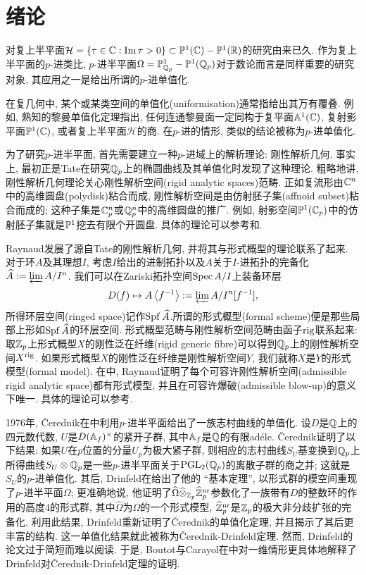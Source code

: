 \section{绪论}
对复上半平面$\mathcal{H} = \{\tau \in\C : \Im\tau > 0\}\subset \P^1(\C)-\P^1(\R)$的研究由来已久. 
作为复上半平面的$p$-进类比, $p$-进半平面$\Omega = \P^1_{\Q_p} - \P^1(\Q_p)$对于数论而言是同样重要的研究对象, 其应用之一是给出所谓的$p$-进单值化.

在复几何中, 某个或某类空间的单值化(uniformisation)通常指给出其万有覆叠.
例如, 熟知的黎曼单值化定理指出, 任何连通黎曼面一定同构于复平面$\A^1(\C)$, 复射影平面$\P^1(\C)$, 或者复上半平面$\mathcal{H}$的商. 在$p$-进的情形, 类似的结论被称为$p$-进单值化. 

为了研究$p$-进半平面, 首先需要建立一种$p$-进域上的解析理论: 刚性解析几何.
事实上, 最初正是Tate在研究$\Q_p$上的椭圆曲线及其单值化时发现了这种理论.
粗略地讲, 刚性解析几何理论关心刚性解析空间(rigid analytic spaces)范畴. 正如复流形由$\C^n$中的高维圆盘(polydisk)粘合而成, 刚性解析空间是由仿射胚子集(affnoid subset)粘合而成的; 这种子集是$\C_p^n$或$\Q_p^n$中的高维圆盘的推广. 例如, 射影空间$\P^1(\C_p)$中的仿射胚子集就是$\P^1$挖去有限个开圆盘. 具体的理论可以参考\cite{BS14}和\cite{FvdP}.

Raynaud发展了源自Tate的刚性解析几何, 并将其与形式概型的理论联系了起来. 对于环$A$及其理想$I$, 考虑$I$给出的进制拓扑以及$A$关于$I$-进拓扑的完备化$\hat{A} := \varprojlim A/I^n$.
我们可以在Zariski拓扑空间$\spec A/I$上装备环层\[D(f)\mapsto A\left<f^{-1}\right> := \varprojlim A/I^n[f^{-1}],\] 所得环层空间(ringed space)记作$\spf \hat{A}$.所谓的形式概型(formal scheme)便是那些局部上形如$\spf \hat{A}$的环层空间.
形式概型范畴与刚性解析空间范畴由函子$\rig$联系起来:
取$\Z_p$上形式概型$X$的刚性泛在纤维(rigid generic fibre)可以得到$\Q_p$上的刚性解析空间$X^{\rig}$.
如果形式概型$X$的刚性泛在纤维是刚性解析空间$Y$, 我们就称$X$是$Y$的形式模型(formal model).
在\cite{raynaud1974geometrie}中, Raynaud证明了每个可容许刚性解析空间(admissible rigid analytic space)都有形式模型, 并且在可容许爆破(admissible blow-up)的意义下唯一.
具体的理论可以参考\cite{BS14}.


1976年, \v{C}erednik在\cite{vcerednik1976uniformization}中利用$p$-进半平面给出了一族志村曲线的单值化.
设$D$是$\Q$上的四元数代数, $U$是$D(\A_f)^\times$的紧开子群, 其中$\A_f$是$\Q$的有限ad\'{e}le.
\v{C}erednik证明了以下结果: 如果$U$在$p$位置的分量$U_p$为极大紧子群,
则相应的志村曲线$S_U$基变换到$\Q_p$上所得曲线$S_U\otimes\Q_p$是一些$p$-进半平面关于$\mathrm{PGL}_2(\Q_p)$的离散子群的商之并; 这就是$S_U$的$p$-进单值化.
其后, Drinfeld在\cite{drinfel1976coverings}给出了他的 ``基本定理'', 以形式群的模空间重现了$p$-进半平面$\Omega$; 更准确地说, 他证明了$\hat{\Omega}\hat{\otimes}_{\Z_p}\hat{\Z}_p^\nr$参数化了一族带有$D$的整数环的作用的高度$4$的形式群,
其中$\hat{\Omega}$为$\Omega$的一个形式模型, $\hat{\Z}_p^\nr$是$\Z_p$的极大非分歧扩张的完备化.
利用此结果, Drinfeld重新证明了\v{C}erednik的单值化定理, 并且揭示了其后更丰富的结构. 这一单值化结果就此被称为\v{C}erednik-Drinfeld定理.
然而, Drinfeld的论文\cite{drinfel1976coverings}过于简短而难以阅读. 于是, Boutot与Carayol在\cite{BC91}中对一维情形更具体地解释了Drinfeld对\v{C}erednik-Drinfeld定理的证明.

